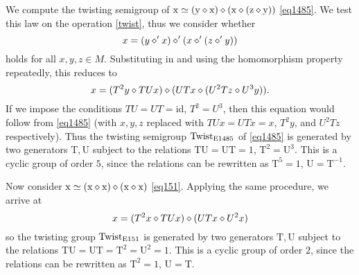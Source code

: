 \begin{example}  We compute the twisting semigroup of $\mathrm{x} \simeq (\mathrm{y} \diamond \mathrm{x}) \diamond (\mathrm{x} \diamond (\mathrm{z} \diamond \mathrm{y}))$ \eqref{eq1485}.  We test this law on the operation \eqref{twist}, thus we consider whether
$$x = (y \diamond' x) \diamond' (x \diamond' (z \diamond' y))$$
holds for all $x,y,z \in M$.  Substituting in  and using the homomorphism property repeatedly, this reduces to
$$x = (T^2y \diamond TUx) \diamond (UTx \diamond (U^2T z \diamond U^3y)).$$
If we impose the conditions $TU=UT=\mathrm{id}$, $T^2 = U^3$, then this equation would follow from \eqref{eq1485} (with $x,y,z$ replaced with $TUx=UTx=x$, $T^2 y$, and $U^2 Tz$ respectively).  Thus the twisting semigroup $\operatorname{Twist}_{\mathrm{E}1485}$ of \eqref{eq1485} is generated by two generators $\mathrm{T}, \mathrm{U}$ subject to the relations $\mathrm{T} \mathrm{U}=\mathrm{U} \mathrm{T} = 1$, $\mathrm{T}^2 = \mathrm{U}^3$.  This is a cyclic group of order $5$, since the relations can be rewritten as $\mathrm{T}^5 = 1$, $\mathrm{U} = \mathrm{T}^{-1}$.

Now consider $\mathrm{x} \simeq (\mathrm{x} \diamond \mathrm{x}) \diamond (\mathrm{x} \diamond \mathrm{x})$ \eqref{eq151}.  Applying the same procedure, we arrive at
$$x = (T^2 x \diamond TUx) \diamond (UT x \diamond U^2 x)$$
so the twisting group $\operatorname{Twist}_{\mathrm{E}151}$ is generated by two generators $\mathrm{T}, \mathrm{U}$ subject to the relations $\mathrm{T} \mathrm{U}=\mathrm{U} \mathrm{T} = \mathrm{T}^2 = \mathrm{U}^2 = 1$.  This is a cyclic group of order $2$, since the relations can be rewritten as $\mathrm{T}^2 = 1$, $\mathrm{U} = \mathrm{T}$.
\end{example}

